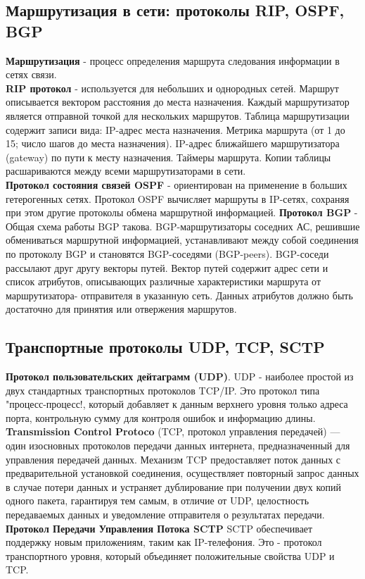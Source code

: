 \documentclass[unicode, 12pt, a4paper,oneside]{article}
\begin{document}
\begin{multicols}{2}
\subsection{Маршрутизация в сети: протоколы RIP, OSPF, BGP}
{\bf Маршрутизация} - процесс определения маршрута следования информации в сетях связи.\\
{\bf RIP протокол} - используется для небольших и однородных сетей. Маршрут описывается вектором расстояния до места назначения. Каждый маршрутизатор является отправной точкой для нескольких маршрутов. Таблица маршрутизации содержит записи вида: IP-адрес места назначения. Метрика маршрута (от 1 до 15; число шагов до места назначения). IP-адрес ближайшего маршрутизатора (gateway) по пути к месту
назначения. Таймеры маршрута. Копии таблицы расшариваются между всеми маршрутизаторами в сети.\\
{\bf Протокол состояния связей OSPF} - ориентирован на применение в больших гетерогенных сетях. Протокол OSPF вычисляет маршруты в IP-сетях, сохраняя при этом другие протоколы обмена маршрутной информацией.
{\bf Протокол BGP} - Общая схема работы BGP такова. BGP-маршрутизаторы соседних АС, решившие обмениваться маршрутной информацией, устанавливают между собой соединения по протоколу BGP и становятся BGP-соседями (BGP-peers).  BGP-соседи рассылают друг другу векторы путей. Вектор путей содержит адрес сети и список атрибутов, описывающих различные характеристики маршрута от маршрутизатора- отправителя в указанную сеть. Данных атрибутов должно быть достаточно для принятия или отвержения маршрутов.

\subsection{Транспортные протоколы UDP, TCP, SCTP}
{\bf Протокол пользовательских дейтаграмм (UDP)}. UDP - наиболее простой из двух стандартных транспортных протоколов TCP/IP. Это протокол типа "процесс-процесс!, который добавляет к данным верхнего уровня только адреса порта, контрольную сумму для контроля ошибок и информацию длины.\\
{\bf Transmission Control Protoco} (TCP, протокол управления передачей) — один изосновных протоколов передачи данных интернета, предназначенный для управления передачей данных. Механизм TCP предоставляет поток данных с предварительной установкой соединения, осуществляет повторный запрос данных в случае потери данных и устраняет дублирование при получении двух копий одного пакета, гарантируя тем самым, в отличие от UDP, целостность передаваемых данных и уведомление отправителя о результатах передачи.\\
{\bf Протокол Передачи Управления Потока SCTP} SCTP обеспечивает поддержку новым приложениям, таким как IP-телефония. Это - протокол транспортного уровня, который объединяет положительные свойства UDP и TCP.


\end{multicols}
\end{document}
